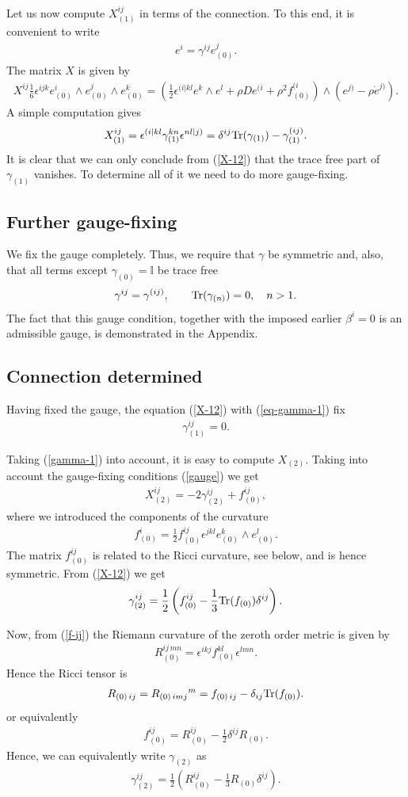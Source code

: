 \documentclass[a4paper,12pt]{article}
\newcommand{\id}{{\mathbb I}}
\newcommand{\be}{\begin{eqnarray}}
\newcommand{\ee}{\end{eqnarray}}
\begin{document}
Let us now compute $X_{(1)}^{ij}$ in terms of the connection. To this end, it is convenient to write
\be
e^i = \gamma^{ij} e^j_{(0)}.
\ee
The matrix $X$ is given by
\be
X^{ij} \frac{1}{6}\epsilon^{ijk} e^i_{(0)}\wedge e^j_{(0)}\wedge e^k_{(0)} = \left( \frac{1}{2} \epsilon^{(i|kl} e^k\wedge e^l + \rho D e^{(i} + \rho^2 f^{(i}_{(0)}\right) \wedge \left( e^{j)} - \rho \dot{e}^{j)}\right).
\ee
A simple computation gives
\be\label{eq-gamma-1}
X^{ij}_{(1)} = \epsilon^{(i|kl} \gamma^{kn}_{(1)} \epsilon^{nl|j)} = \delta^{ij} {\rm Tr}(\gamma_{(1)}) - \gamma_{(1)}^{(ij)}.
\ee
It is clear that we can only conclude from (\ref{X-12}) that the trace free part of $\gamma_{(1)}$ vanishes. To determine all of it we need to do more gauge-fixing. 

\subsection{Further gauge-fixing}

We fix the gauge completely. Thus, we require that $\gamma$ be symmetric and, also, that all terms except $\gamma_{(0)}=\id$ be trace free
\be\label{gauge}
\gamma^{ij}=\gamma^{(ij)}, \qquad {\rm Tr}(\gamma_{(n)})=0, \quad n>1.
\ee
The fact that this gauge condition, together with the imposed earlier $\beta^i=0$ is an admissible gauge, is demonstrated in the Appendix. 

\subsection{Connection determined}

Having fixed the gauge, the equation (\ref{X-12}) with (\ref{eq-gamma-1}) fix 
\be\label{gamma-1}
\gamma_{(1)}^{ij}=0.
\ee

Taking (\ref{gamma-1}) into account, it is easy to compute $X_{(2)}$. Taking into account the gauge-fixing conditions (\ref{gauge}) we get
\be
X_{(2)}^{ij} = - 2\gamma_{(2)}^{ij} + f^{ij}_{(0)},
\ee
where we introduced the components of the curvature
\be\label{f-ij}
f^i_{(0)} = \frac{1}{2} f^{ij}_{(0)} \epsilon^{jkl} e^k_{(0)}\wedge e^l_{(0)}.
\ee
The matrix $f^{ij}_{(0)}$ is related to the Ricci curvature, see below, and is hence symmetric. From (\ref{X-12}) we get
\be
\gamma_{(2)}^{ij} = \frac{1}{2} \left( f^{ij}_{(0)} - \frac{1}{3} {\rm Tr}(f_{(0)}) \delta^{ij}\right).
\ee

Now, from (\ref{f-ij}) the Riemann curvature of the zeroth order metric is given by
\be
R^{ij \, mn}_{(0)} = \epsilon^{ikj}  f^{kl}_{(0)} \epsilon^{lmn}.
\ee
Hence the Ricci tensor is 
\be
R_{(0)\,ij} = R_{(0)\,imj}{}^m = f_{(0)\,ij} - \delta_{ij} {\rm Tr}(f_{(0)}).
\ee
or equivalently
\be
f^{ij}_{(0)} = R^{ij}_{(0)} - \frac{1}{2} \delta^{ij} R_{(0)}.
\ee
Hence, we can equivalently write $\gamma_{(2)}$ as
\be
\gamma_{(2)}^{ij} =\frac{1}{2}\left( R^{ij}_{(0)} - \frac{1}{3} R_{(0)} \delta^{ij}\right).
\ee
\end{document}
